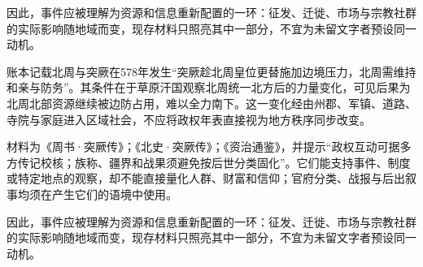 因此，事件应被理解为资源和信息重新配置的一环：征发、迁徙、市场与宗教社群的实际影响随地域而变，现存材料只照亮其中一部分，不宜为未留文字者预设同一动机。

账本记载北周与突厥在578年发生“突厥趁北周皇位更替施加边境压力，北周需维持和亲与防务”。其条件在于草原汗国观察北周统一北方后的力量变化，可见后果为北周北部资源继续被边防占用，难以全力南下。这一变化经由州郡、军镇、道路、寺院与家庭进入区域社会，不应将政权年表直接视为地方秩序同步改变。

材料为《周书·突厥传》；《北史·突厥传》；《资治通鉴》，并提示“政权互动可据多方传记校核；族称、疆界和战果须避免按后世分类固化”。它们能支持事件、制度或特定地点的观察，却不能直接量化人群、财富和信仰；官府分类、战报与后出叙事均须在产生它们的语境中使用。

因此，事件应被理解为资源和信息重新配置的一环：征发、迁徙、市场与宗教社群的实际影响随地域而变，现存材料只照亮其中一部分，不宜为未留文字者预设同一动机。
